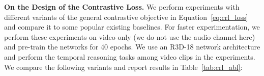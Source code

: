 \documentclass[letterpaper]{article} %
\begin{document}




\noindent \textbf{On the Design of the Contrastive Loss.}
We perform experiments with different variants of the general contrastive objective in Equation~\ref{eq:crl_loss} and compare it to some popular existing baselines.
For faster experimentation, we perform these experiments on video only (we do not use the audio channel here) and pre-train the networks for 40 epochs.
We use an R3D-18 network architecture and perform the temporal reasoning tasks among video clips in the experiments.
We compare the following variants and report results in Table~\ref{tab:crl_abl}:
\end{document}
